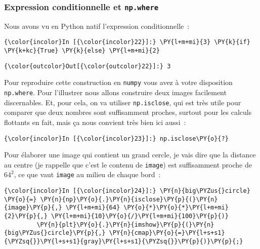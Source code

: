     \hypertarget{expression-conditionnelle-et-np.where}{%
\subsubsection{\texorpdfstring{Expression conditionnelle et
\texttt{np.where}}{Expression conditionnelle et np.where}}\label{expression-conditionnelle-et-np.where}}

    Nous avons vu en Python natif l'expression conditionnelle~:

    \begin{Verbatim}[commandchars=\\\{\},frame=single,framerule=0.3mm,rulecolor=\color{cellframecolor}]
{\color{incolor}In [{\color{incolor}22}]:} \PY{l+m+mi}{3} \PY{k}{if} \PY{k+kc}{True} \PY{k}{else} \PY{l+m+mi}{2}
\end{Verbatim}


\begin{Verbatim}[commandchars=\\\{\},frame=single,framerule=0.3mm,rulecolor=\color{cellframecolor}]
{\color{outcolor}Out[{\color{outcolor}22}]:} 3
\end{Verbatim}
            
    Pour reproduire cette construction en \texttt{numpy} vous avez à votre
disposition \texttt{np.where}. Pour l'illustrer nous allons construire
deux images facilement discernables. Et, pour cela, on va utiliser
\texttt{np.isclose}, qui est très utile pour comparer que deux nombres
sont suffisamment proches, surtout pour les calculs flottants en fait,
mais ça nous convient très bien ici aussi~:

    \begin{Verbatim}[commandchars=\\\{\},frame=single,framerule=0.3mm,rulecolor=\color{cellframecolor}]
{\color{incolor}In [{\color{incolor}23}]:} np.isclose\PY{o}{?}
\end{Verbatim}


    Pour élaborer une image qui contient un grand cercle, je vais dire que
la distance au centre (je rappelle que c'est le contenu de
\texttt{image}) est suffisamment proche de \(64^2\), ce que vaut
\texttt{image} au milieu de chaque bord~:

    \begin{Verbatim}[commandchars=\\\{\},frame=single,framerule=0.3mm,rulecolor=\color{cellframecolor}]
{\color{incolor}In [{\color{incolor}24}]:} \PY{n}{big\PYZus{}circle} \PY{o}{=} \PY{n}{np}\PY{o}{.}\PY{n}{isclose}\PY{p}{(}\PY{n}{image}\PY{p}{,} \PY{l+m+mi}{64} \PY{o}{*}\PY{o}{*}\PY{l+m+mi}{2}\PY{p}{,} \PY{l+m+mi}{10}\PY{o}{/}\PY{l+m+mi}{100}\PY{p}{)}
         \PY{n}{plt}\PY{o}{.}\PY{n}{imshow}\PY{p}{(}\PY{n}{big\PYZus{}circle}\PY{p}{,} \PY{n}{cmap}\PY{o}{=}\PY{l+s+s1}{\PYZsq{}}\PY{l+s+s1}{gray}\PY{l+s+s1}{\PYZsq{}}\PY{p}{)}\PY{p}{;}
\end{Verbatim}


